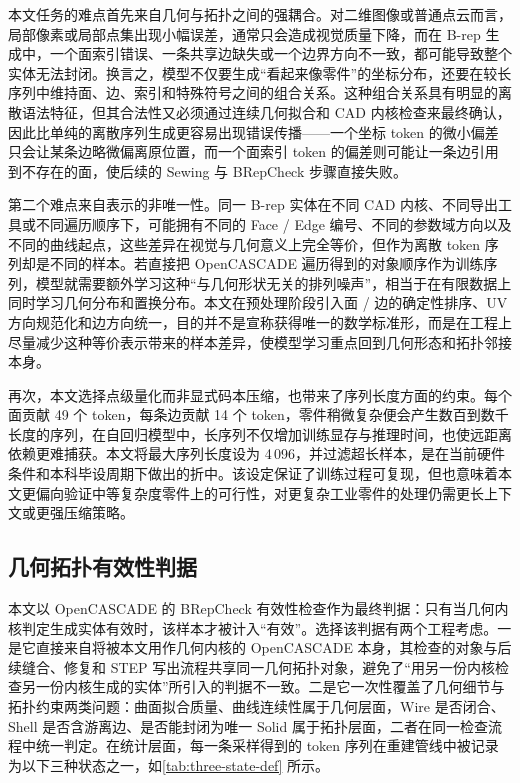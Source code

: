 本文任务的难点首先来自几何与拓扑之间的强耦合。对二维图像或普通点云而言，局部像素或局部点集出现小幅误差，通常只会造成视觉质量下降，而在 B-rep 生成中，一个面索引错误、一条共享边缺失或一个边界方向不一致，都可能导致整个实体无法封闭。换言之，模型不仅要生成“看起来像零件”的坐标分布，还要在较长序列中维持面、边、索引和特殊符号之间的组合关系。这种组合关系具有明显的离散语法特征，但其合法性又必须通过连续几何拟合和 CAD 内核检查来最终确认，因此比单纯的离散序列生成更容易出现错误传播——一个坐标 token 的微小偏差只会让某条边略微偏离原位置，而一个面索引 token 的偏差则可能让一条边引用到不存在的面，使后续的 Sewing 与 BRepCheck 步骤直接失败。

第二个难点来自表示的非唯一性。同一 B-rep 实体在不同 CAD 内核、不同导出工具或不同遍历顺序下，可能拥有不同的 Face / Edge 编号、不同的参数域方向以及不同的曲线起点，这些差异在视觉与几何意义上完全等价，但作为离散 token 序列却是不同的样本。若直接把 OpenCASCADE 遍历得到的对象顺序作为训练序列，模型就需要额外学习这种“与几何形状无关的排列噪声”，相当于在有限数据上同时学习几何分布和置换分布。本文在预处理阶段引入面 / 边的确定性排序、UV 方向规范化和边方向统一，目的并不是宣称获得唯一的数学标准形，而是在工程上尽量减少这种等价表示带来的样本差异，使模型学习重点回到几何形态和拓扑邻接本身。

再次，本文选择点级量化而非显式码本压缩，也带来了序列长度方面的约束。每个面贡献 49 个 token，每条边贡献 14 个 token，零件稍微复杂便会产生数百到数千长度的序列，在自回归模型中，长序列不仅增加训练显存与推理时间，也使远距离依赖更难捕获。本文将最大序列长度设为 4\,096，并过滤超长样本，是在当前硬件条件和本科毕设周期下做出的折中。该设定保证了训练过程可复现，但也意味着本文更偏向验证中等复杂度零件上的可行性，对更复杂工业零件的处理仍需更长上下文或更强压缩策略。

\subsection{几何拓扑有效性判据}

本文以 OpenCASCADE 的 BRepCheck 有效性检查作为最终判据：只有当几何内核判定生成实体有效时，该样本才被计入“有效”。选择该判据有两个工程考虑。一是它直接来自将被本文用作几何内核的 OpenCASCADE 本身，其检查的对象与后续缝合、修复和 STEP 写出流程共享同一几何拓扑对象，避免了“用另一份内核检查另一份内核生成的实体”所引入的判据不一致。二是它一次性覆盖了几何细节与拓扑约束两类问题：曲面拟合质量、曲线连续性属于几何层面，Wire 是否闭合、Shell 是否含游离边、是否能封闭为唯一 Solid 属于拓扑层面，二者在同一检查流程中统一判定。在统计层面，每一条采样得到的 token 序列在重建管线中被记录为以下三种状态之一，如\autoref{tab:three-state-def} 所示。

